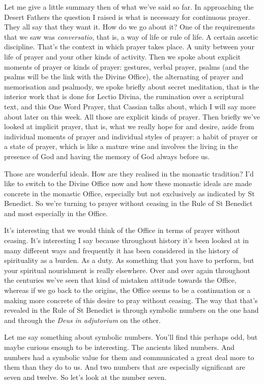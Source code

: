 Let me give a little summary then of what we've said so far. In approaching the Desert Fathers the question I raised is what is necessary for continuous prayer. They all say that they want it. How do we go about it? One of the requirements that we saw was \emph{conversatio}, that is, a way of life or rule of life. A certain ascetic discipline. That's the context in which prayer takes place. A unity between your life of prayer and your other kinds of activity. Then we spoke about explicit moments of prayer or kinds of prayer: gestures, verbal prayer, psalms (and the psalms will be the link with the Divine Office), the alternating of prayer and memorisation and psalmody, we spoke briefly about secret meditation, that is the interior work that is done for Lectio Divina, the rumination over a scriptural text, and this One Word Prayer, that Cassian talks about, which I will say more about later on this week. All those are explicit kinds of prayer. Then briefly we've looked at implicit prayer, that is, what we really hope for and desire, aside from individual moments of prayer and individual styles of prayer: a habit of prayer or a state of prayer, which is like a mature wine and involves the living in the presence of God and having the memory of God always before us.

Those are wonderful ideals. How are they realised in the monastic tradition? I'd like to switch to the Divine Office now and how these monastic ideals are made concrete in the monastic Office, especially but not exclusively as indicated by St Benedict. So we're turning to prayer without ceasing in the Rule of St Benedict and most especially in the Office.

It's interesting that we would think of the Office in terms of prayer without ceasing. It's interesting I say because throughout history it's been looked at in many different ways and frequently it has been considered in the history of spirituality as a burden. As a duty. As something that you have to perform, but your spiritual nourishment is really elsewhere. Over and over again throughout the centuries we've seen that kind of mistaken attitude towards the Office, whereas if we go back to the origins, the Office seems to be a continuation or a making more concrete of this desire to pray without ceasing. The way that that's revealed in the Rule of St Benedict is through symbolic numbers on the one hand and through the \emph{Deus in adjutorium} on the other.

Let me say something about symbolic numbers. You'll find this perhaps odd, but maybe curious enough to be interesting. The ancients liked numbers. And numbers had a symbolic value for them and communicated a great deal more to them than they do to us. And two numbers that are especially significant are seven and twelve. So let's look at the number seven.

